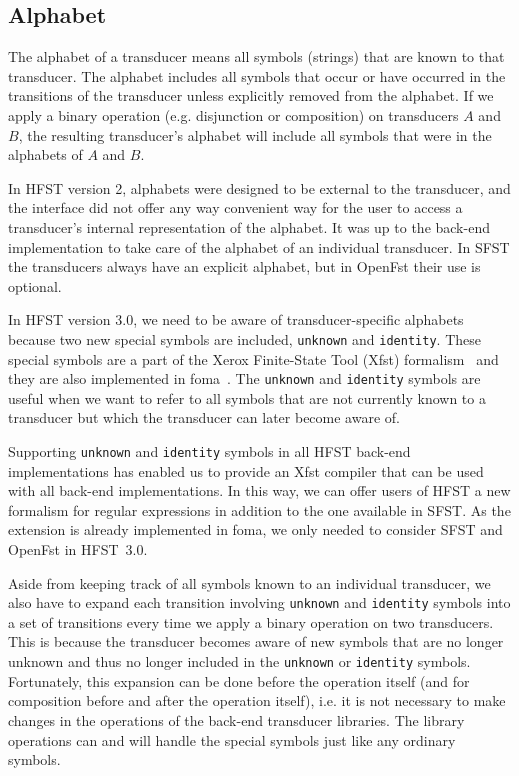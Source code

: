 \documentclass{llncs}
\begin{document}
\subsection{Alphabet}
The alphabet of a transducer means all symbols (strings) that are
known to that transducer. The alphabet includes all symbols that occur 
or have occurred in the transitions of the transducer unless explicitly
removed from the alphabet. 
If we apply a binary operation (e.g. disjunction or composition) on 
transducers $A$ and $B$, the resulting transducer's alphabet will include
all symbols that were in the alphabets of $A$ and $B$. 

In HFST version 2, alphabets were designed to be external to the transducer,
and the interface did not offer any way convenient way for the user to access a 
transducer's internal representation of the alphabet. It was up to the back-end 
implementation to take care of the alphabet of an individual transducer. In SFST 
the transducers always have an explicit alphabet, but in OpenFst their use is optional.
 
In HFST version 3.0, we need to be aware of transducer-specific alphabets 
because two new special symbols are included, \texttt{unknown} and \texttt{identity}. 
These special symbols are a part of the Xerox Finite-State Tool (Xfst) 
formalism~\cite{beesley/2003} and they are also implemented in
foma~\cite{hulden/2009}. The \texttt{unknown} and \texttt{identity} symbols 
are useful when we want to refer to all symbols that are not currently 
known to a transducer but which the transducer can later become aware of. 

Supporting \texttt{unknown} and \texttt{identity} symbols in all HFST back-end
implementations has enabled us to provide an Xfst compiler that can be used
with all back-end implementations. 
In this way, we can offer users of HFST a new 
formalism for regular expressions in addition to the one available in SFST. 
As the extension is already implemented in foma, we only needed to 
consider SFST and OpenFst in HFST~3.0.

Aside from keeping track of all symbols known to an individual transducer, we also
have to expand each transition involving \texttt{unknown} and 
\texttt{identity} symbols into a set of transitions every time we apply 
a binary operation on two transducers. 
This is because the transducer becomes aware of new symbols that are
no longer unknown and thus no longer included in the \texttt{unknown} or 
\texttt{identity} symbols.
Fortunately, this expansion can be done before the operation itself 
(and for composition before and after the operation itself), i.e. it is  
not necessary to make changes in the operations of the back-end transducer
libraries. 
The library operations can and will handle the special symbols just
like any ordinary symbols. 
\end{document}
